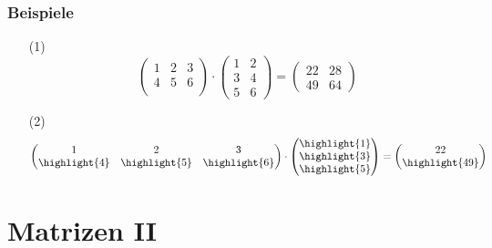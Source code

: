 %
%
\begin{frame}\frametitle{Beispiele}

	\begin{itemize}
		\item[(1)]
			$$
				\begin{pmatrix}
					1			&2			&3	\\
					{4}	&{5}	&{6}	\\		
				\end{pmatrix}
				\cdot
				\begin{pmatrix}
					1	&{2}	\\
					3	&{4}	\\
					5	&{6}	
				\end{pmatrix}
				=
				\begin{pmatrix}
					22	&28	\\
					49	&{64}
				\end{pmatrix}
			$$

		\item[(2)]
			$$
				\begin{pmatrix}
					1			&2			&3	\\
					\highlight{4}	&\highlight{5}	&\highlight{6}	\\		
				\end{pmatrix}
				\cdot
				\begin{pmatrix}
					\highlight{1}	\\
					\highlight{3}	\\
					\highlight{5}		
				\end{pmatrix}
				=
				\begin{pmatrix}
					22	\\
					\highlight{49}
				\end{pmatrix}
			$$
	
	\end{itemize}
\end{frame}
%
\section{Matrizen II}
%
